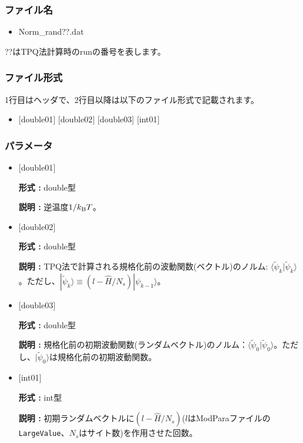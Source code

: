 \subsubsection{ファイル名}
\begin{itemize}
   \item Norm\_rand??.dat
  \end{itemize}
  ??はTPQ法計算時のrunの番号を表します。


\subsubsection{ファイル形式}
1行目はヘッダで、2行目以降は以下のファイル形式で記載されます。
 \begin{itemize}
   \item $[$double01$]$ $[$double02$]$ $[$double03$]$ $[$int01$]$
  \end{itemize}
\subsubsection{パラメータ}
 \begin{itemize}

  \item  $[$double01$]$
  
 {\bf 形式 :} double型

{\bf 説明 :} 逆温度$1/{k_{\rm B}T}$。
 
  \item $[$double02$]$

 {\bf 形式 :} double型 

{\bf 説明 :}  TPQ法で計算される規格化前の波動関数(ベクトル)のノルム:
 $\langle \tilde{\psi}_{k} |\tilde{\psi}_{k}\rangle$。ただし、$|\tilde{\psi}_{k}\rangle \equiv(l-\hat{H}/N_{s})|\psi_{k-1}\rangle$。

  \item $[$double03$]$

 {\bf 形式 :} double型 

{\bf 説明 :} 規格化前の初期波動関数(ランダムベクトル)のノルム：$\langle \tilde{\psi}_{0} |\tilde{\psi}_{0}\rangle$。ただし、$|\tilde{\psi}_{0}\rangle$は規格化前の初期波動関数。

  \item $[$int01$]$

 {\bf 形式 :} int型 

{\bf 説明 :} 初期ランダムベクトルに$(l-\hat{H}/N_{s})$($l$はModParaファイルの\verb|LargeValue|、$N_{s}$はサイト数)を作用させた回数。

 \end{itemize}


